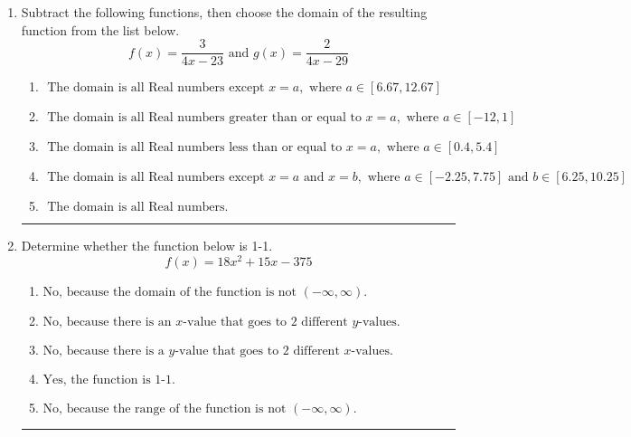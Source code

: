 \documentclass[14pt]{extbook}
\newcommand{\litem}[1]{\item#1\hspace*{-1cm}\rule{\textwidth}{0.4pt}}
\begin{document}
\begin{enumerate}
{\begin{enumerate}[label=\Alph*.]
\end{enumerate} }
\litem{
Subtract the following functions, then choose the domain of the resulting function from the list below.\[ f(x) = \frac{3}{4x-23} \text{ and } g(x) = \frac{2}{4x-29} \]\begin{enumerate}[label=\Alph*.]
\item \( \text{ The domain is all Real numbers except } x = a, \text{ where } a \in [6.67, 12.67] \)
\item \( \text{ The domain is all Real numbers greater than or equal to } x = a, \text{ where } a \in [-12, 1] \)
\item \( \text{ The domain is all Real numbers less than or equal to } x = a, \text{ where } a \in [0.4, 5.4] \)
\item \( \text{ The domain is all Real numbers except } x = a \text{ and } x = b, \text{ where } a \in [-2.25, 7.75] \text{ and } b \in [6.25, 10.25] \)
\item \( \text{ The domain is all Real numbers. } \)

\end{enumerate} }
\litem{
Determine whether the function below is 1-1.\[ f(x) = 18 x^2 + 15 x - 375 \]\begin{enumerate}[label=\Alph*.]
\item \( \text{No, because the domain of the function is not $(-\infty, \infty)$.} \)
\item \( \text{No, because there is an $x$-value that goes to 2 different $y$-values.} \)
\item \( \text{No, because there is a $y$-value that goes to 2 different $x$-values.} \)
\item \( \text{Yes, the function is 1-1.} \)
\item \( \text{No, because the range of the function is not $(-\infty, \infty)$.} \)

\end{enumerate} }
\end{enumerate}
\end{document}
